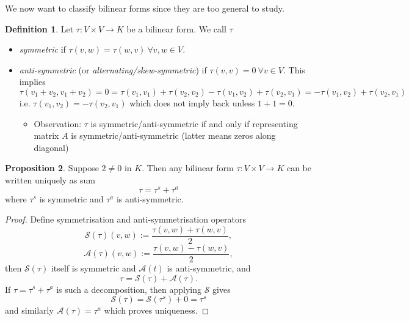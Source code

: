 \documentclass[a4paper]{article}
\theoremstyle{definition}
\newtheorem{defn}{Definition}[subsection]
\newtheorem{prop}[defn]{Proposition}
\begin{document}
We now want to classify bilinear forms since they are too general to study.
\begin{defn}
    Let $\tau : V\times V \rightarrow K$ be a bilinear form. We call $\tau$ \begin{itemize}
        \item \textit{symmetric} if $\tau (v,w)=\tau (w,v) \ \forall v,w \in V$.
        \item \textit{anti-symmetric} (or \textit{alternating/skew-symmetric}) if $\tau (v,v)=0 \ \forall v\in V$.
        This implies
\[
\tau (v_1+v_2,v_1+v_2)=0=\tau (v_1,v_1) + \tau (v_2,v_2) -\tau (v_1,v_2)+\tau (v_2,v_1)=-\tau (v_1,v_2)+\tau (v_2,v_1)
\]
i.e. $\tau (v_1,v_2)=-\tau (v_2,v_1)$ which does not imply back unless $1+1=0$.
        \begin{itemize}
            \item Observation: $\tau$ is symmetric/anti-symmetric if and only if representing matrix $A$ is symmetric/anti-symmetric (latter means zeros along diagonal)
        \end{itemize}
    \end{itemize}
\end{defn}

\begin{prop}
Suppose $2\neq 0$ in $K$. Then any bilinear form $\tau :V\times V\rightarrow K$ can be written uniquely as sum
\[
\tau = \tau^s+\tau^a
\]
where $\tau^s$ is symmetric and $\tau^a$ is anti-symmetric.
\end{prop}
\begin{proof}
Define symmetrisation and anti-symmetrisation operators
\[
\mathcal S(\tau) (v,w) := \frac{\tau(v,w)+\tau(w,v)}{2},
\]
\[
\mathcal A(\tau) (v,w) := \frac{\tau(v,w)-\tau(w,v)}{2},
\]
then $\mathcal S(\tau)$ itself is symmetric and $\mathcal A(t)$ is anti-symmetric, and
\[
\tau=\mathcal S(\tau)+\mathcal A(\tau).
\]
If $\tau = \tau^s+\tau^a$ is such a decomposition, then applying $\mathcal S$ gives
\[
\mathcal S(\tau) = \mathcal S(\tau^s)+0=\tau ^s
\]
and similarly $\mathcal A(\tau) = \tau ^a$ which proves uniqueness.
\end{proof}
\end{document}
